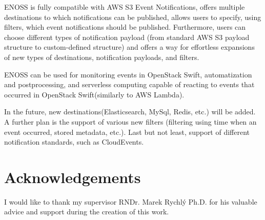 \documentclass{ExcelAtFIT}
\begin{document}
ENOSS is fully compatible with AWS S3 Event Notifications, offers multiple destinations to which notifications can be published, allows users to specify, using filters, which event notifications should be published. Furthermore, users can choose different types of notification payload (from standard AWS S3 payload structure to custom-defined structure) and offers a way for effortless expansions of new types of destinations, notification payloads, and filters.

ENOSS can be used for monitoring events in OpenStack Swift, automatization and postprocessing, and serverless computing capable of reacting to events that occurred in OpenStack Swift(similarly to AWS Lambda).


In the future, new destinations(Elasticsearch, MySql, Redis, etc.) will be added. A further plan is the support of various new filters (filtering using time when an event occurred, stored metadata, etc.). Last but not least, support of different notification standards, such as CloudEvents.

\section*{Acknowledgements}\label{sec:ackn}
I would like to thank my supervisor RNDr. Marek Rychlý Ph.D. for his valuable advice and support during the creation of this work.





\end{document}
